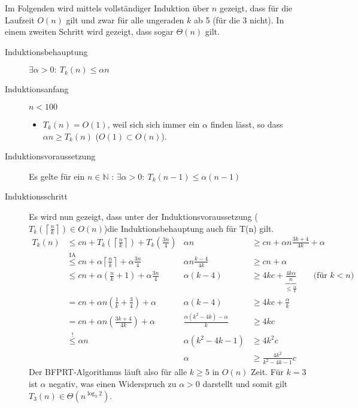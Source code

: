 \documentclass[a4paper,10pt]{scrartcl}
\begin{document}
Im Folgenden wird mittels vollständiger Induktion über $n$ gezeigt, dass für die Laufzeit $O(n)$ gilt und zwar für alle ungeraden $k$ ab 5 (für die 3 nicht). In einem zweiten Schritt wird gezeigt, dass sogar $\Theta(n)$ gilt.
\begin{description}
\item[Induktionsbehauptung] $\exists\alpha > 0{:}\ T_k(n) \leq \alpha n$
\item[Induktionsanfang] $n < 100$
    \begin{itemize}
     \item $T_k(n) = O(1)$, weil sich sich immer ein $\alpha$ finden lässt, so dass $\alpha n \geq T_k(n)$ ($O(1) \subset O(n)$).
    \end{itemize}
\item[Induktionsvoraussetzung] Es gelte für ein $n \in \mathbb{N}$ : $\exists\alpha > 0{:}\ T_k(n-1) \leq \alpha (n-1)$

\item[Induktionsschritt] Es wird nun gezeigt, dass unter der Induktionsvoraussetzung ($T_k\left(\left\lceil\frac{n}{k}\right\rceil\right) \in O(n)$)die Induktionsbehauptung auch für T(n) gilt.
\[
\begin{array}{rl|rl}
 T_k(n)   &\leq cn + T_k\left(\left\lceil\frac{n}{k}\right\rceil\right) + T_k\left(\frac{3n}{4}\right) &
                \alpha n &\geq cn + \alpha n \frac{3k + 4}{4k} + \alpha\\
        &\overset{\text{IA}}{\leq} cn + \alpha \left\lceil\frac{n}{k}\right\rceil + \alpha \frac{3n}{4} &
                \alpha n \frac{k - 4}{4k} &\geq cn + \alpha\\
        &\leq cn + \alpha \left(\frac{n}{k} + 1\right) + \alpha \frac{3n}{4} &
                \alpha (k - 4) &\geq 4kc + \underbrace{\frac{4k\alpha}{n}}_{\leq \frac{\alpha}{k}} \qquad \text{(für $k < n$)} \\
        &= cn + \alpha n \left(\frac{1}{k} + \frac{3}{4}\right) + \alpha  &
                \alpha (k - 4) &\geq 4kc + \frac{\alpha}{k}\\
        &= cn + \alpha n \left(\frac{3k + 4}{4k}\right) + \alpha &
                \frac{\alpha (k^2 - 4k) - \alpha}{k} &\geq 4kc\\
        &\overset{!}{\leq} \alpha n &
                \alpha (k^2 - 4k - 1) &\geq 4k^2c\\
        && \alpha &\geq \frac{4k^2}{k^2 - 4k - 1} c
\end{array}
\]
 Der BFPRT-Algorithmus läuft also für alle  $k \ge 5$ in $O(n)$ Zeit. Für $k = 3$ ist $\alpha$ negativ, was einen Widerspruch zu $\alpha > 0$ darstellt und somit gilt $T_3(n) \in \Theta(n^{\log_3 2})$.
\end{description}
\end{document}
